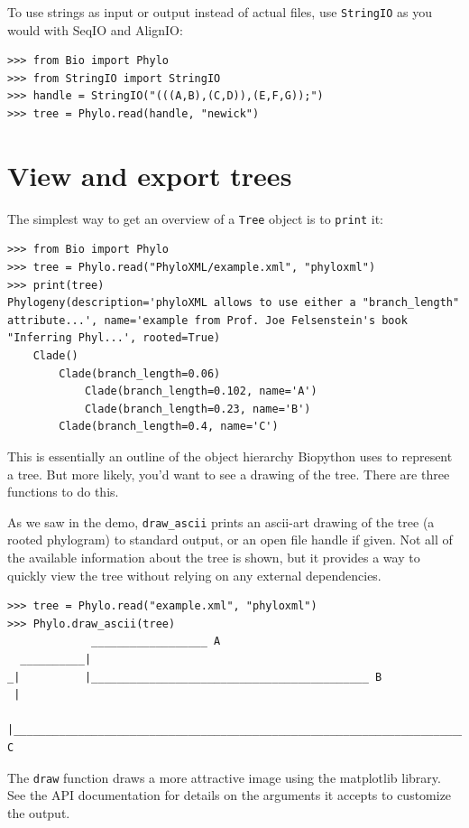 \documentclass{report}
\begin{document}
To use strings as input or output instead of actual files, use \verb|StringIO| as you would
with SeqIO and AlignIO:

\begin{verbatim}
>>> from Bio import Phylo
>>> from StringIO import StringIO
>>> handle = StringIO("(((A,B),(C,D)),(E,F,G));")
>>> tree = Phylo.read(handle, "newick")
\end{verbatim}


\section{View and export trees}

The simplest way to get an overview of a \verb|Tree| object is to \verb|print| it:

\begin{verbatim}
>>> from Bio import Phylo
>>> tree = Phylo.read("PhyloXML/example.xml", "phyloxml")
>>> print(tree)
Phylogeny(description='phyloXML allows to use either a "branch_length" attribute...', name='example from Prof. Joe Felsenstein's book "Inferring Phyl...', rooted=True)
    Clade()
        Clade(branch_length=0.06)
            Clade(branch_length=0.102, name='A')
            Clade(branch_length=0.23, name='B')
        Clade(branch_length=0.4, name='C')
\end{verbatim}

This is essentially an outline of the object hierarchy Biopython uses to represent a tree. But
more likely, you'd want to see a drawing of the tree. There are three functions to do this.

As we saw in the demo, \verb|draw_ascii| prints an ascii-art drawing of the tree (a
rooted phylogram) to standard output, or an open file handle if given. Not all of the
available information about the tree is shown, but it provides a way to quickly view the
tree without relying on any external dependencies.

\begin{verbatim}
>>> tree = Phylo.read("example.xml", "phyloxml")
>>> Phylo.draw_ascii(tree)
             __________________ A
  __________|
_|          |___________________________________________ B
 |
 |___________________________________________________________________________ C

\end{verbatim}

The \verb|draw| function draws a more attractive image using the matplotlib
library. See the API documentation for details on the arguments it accepts to
customize the output.
\end{document}
